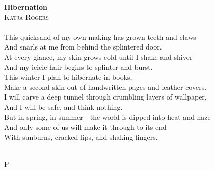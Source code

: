 \documentclass[11pt]{article}
\begin{document}
\thispagestyle{empty}

\textbf{Hibernation}\\
\textsc{Katja Rogers}\\
\ \\

This quicksand of my own making has grown teeth and claws\\
And snarls at me from behind the splintered door.\\
At every glance, my skin grows cold until I shake and shiver\\
And my icicle hair begins to splinter and burst.\\

This winter I plan to hibernate in books,\\
Make a second skin out of handwritten pages and leather covers.\\
I will carve a deep tunnel through crumbling layers of wallpaper,\\
And I will be safe, and think nothing.\\

But in spring, in summer---the world is dipped into heat and haze\\
And only some of us will make it through to its end\\
With sunburns, cracked lips, and shaking fingers.

\ \\


\fontsize{28pt}{28pt}
\selectfont 
\hspace{3.5cm}
\color{light-gray}
P
\end{document}
